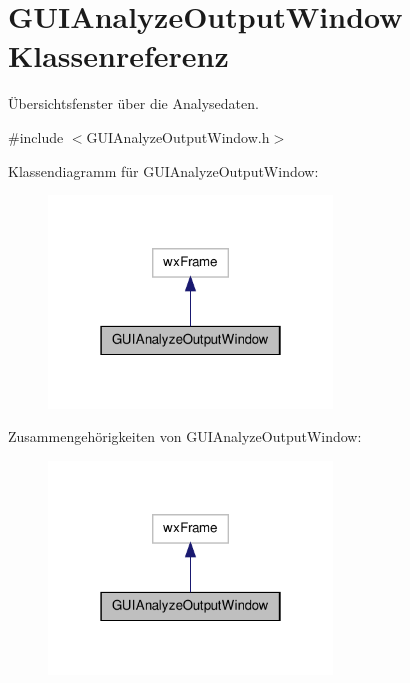 \hypertarget{classGUIAnalyzeOutputWindow}{\section{G\-U\-I\-Analyze\-Output\-Window Klassenreferenz}
\label{classGUIAnalyzeOutputWindow}
}


Übersichtsfenster über die Analysedaten.  




{\ttfamily \#include $<$G\-U\-I\-Analyze\-Output\-Window.\-h$>$}



Klassendiagramm für G\-U\-I\-Analyze\-Output\-Window\-:\nopagebreak
\begin{figure}[H]
\begin{center}
\leavevmode
\includegraphics[width=214pt]{classGUIAnalyzeOutputWindow__inherit__graph}
\end{center}
\end{figure}


Zusammengehörigkeiten von G\-U\-I\-Analyze\-Output\-Window\-:\nopagebreak
\begin{figure}[H]
\begin{center}
\leavevmode
\includegraphics[width=214pt]{classGUIAnalyzeOutputWindow__coll__graph}
\end{center}
\end{figure}
